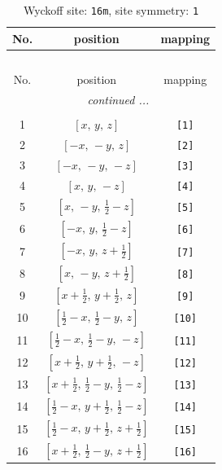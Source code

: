 \documentclass[fleqn,8pt]{jsarticle}
\begin{document}
\begin{longtable}{ccc}
\caption{Wyckoff site: {\tt 16m}, site symmetry: {\tt 1}}
 \\
 \hline \hline
No. & position & mapping \\ \hline \endfirsthead

\multicolumn{2}{l}{\tablename\ \thetable{}} \\
 \hline \hline
No. & position & mapping \\ \hline \endhead

 \hline \hline
\multicolumn{2}{r}{\footnotesize\it continued ...} \\ \endfoot

 \hline \hline
\multicolumn{2}{r}{} \\ \endlastfoot

1 & $\left[ x,\, y,\, z \right]$ & {\tt [1]} \\ \hline
2 & $\left[ - x,\, - y,\, z \right]$ & {\tt [2]} \\ \hline
3 & $\left[ - x,\, - y,\, - z \right]$ & {\tt [3]} \\ \hline
4 & $\left[ x,\, y,\, - z \right]$ & {\tt [4]} \\ \hline
5 & $\left[ x,\, - y,\, \frac{1}{2} - z \right]$ & {\tt [5]} \\ \hline
6 & $\left[ - x,\, y,\, \frac{1}{2} - z \right]$ & {\tt [6]} \\ \hline
7 & $\left[ - x,\, y,\, z + \frac{1}{2} \right]$ & {\tt [7]} \\ \hline
8 & $\left[ x,\, - y,\, z + \frac{1}{2} \right]$ & {\tt [8]} \\ \hline
9 & $\left[ x + \frac{1}{2},\, y + \frac{1}{2},\, z \right]$ & {\tt [9]} \\ \hline
10 & $\left[ \frac{1}{2} - x,\, \frac{1}{2} - y,\, z \right]$ & {\tt [10]} \\ \hline
11 & $\left[ \frac{1}{2} - x,\, \frac{1}{2} - y,\, - z \right]$ & {\tt [11]} \\ \hline
12 & $\left[ x + \frac{1}{2},\, y + \frac{1}{2},\, - z \right]$ & {\tt [12]} \\ \hline
13 & $\left[ x + \frac{1}{2},\, \frac{1}{2} - y,\, \frac{1}{2} - z \right]$ & {\tt [13]} \\ \hline
14 & $\left[ \frac{1}{2} - x,\, y + \frac{1}{2},\, \frac{1}{2} - z \right]$ & {\tt [14]} \\ \hline
15 & $\left[ \frac{1}{2} - x,\, y + \frac{1}{2},\, z + \frac{1}{2} \right]$ & {\tt [15]} \\ \hline
16 & $\left[ x + \frac{1}{2},\, \frac{1}{2} - y,\, z + \frac{1}{2} \right]$ & {\tt [16]} \\
\end{longtable}
\end{document}
